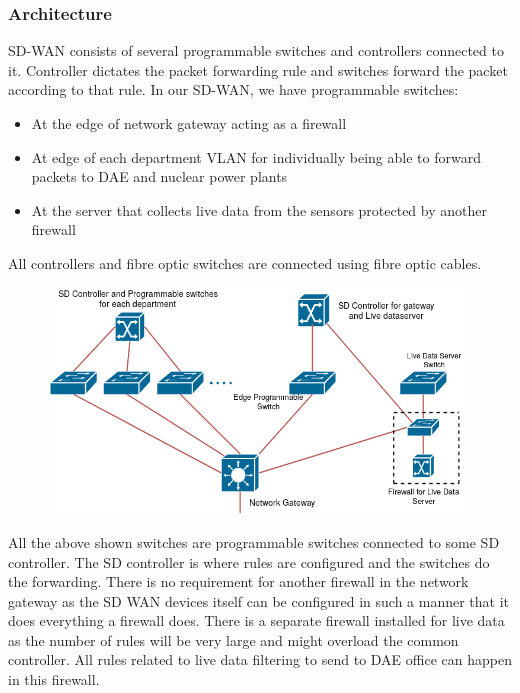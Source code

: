 \documentclass{article}
\begin{document}
\subsubsection{Architecture}
SD-WAN consists of several programmable switches and controllers connected to it. Controller dictates the packet forwarding rule and switches forward the packet according to that rule. In our SD-WAN, we have programmable switches:
\begin{itemize}
	\item At the edge of network gateway acting as a firewall
	\item At edge of each department VLAN for individually being able to forward packets to DAE and nuclear power plants
	\item At the server that collects live data from the sensors protected by another firewall
\end{itemize}
All controllers and fibre optic switches are connected using fibre optic cables.
\begin{figure}[htb]
	\centering
	\includegraphics[width=12cm,height=6cm]{sdwan.png}
\end{figure}
All the above shown switches are programmable switches connected to some SD controller. The SD controller is where rules are configured and the switches do the forwarding. There is no requirement for another firewall in the network gateway as the SD WAN devices itself can be configured in such a manner that it does everything a firewall does. There is a separate firewall installed for live data as the number of rules will be very large and might overload the common controller. All rules related to live data filtering to send to DAE office can happen in this firewall.
\end{document}
